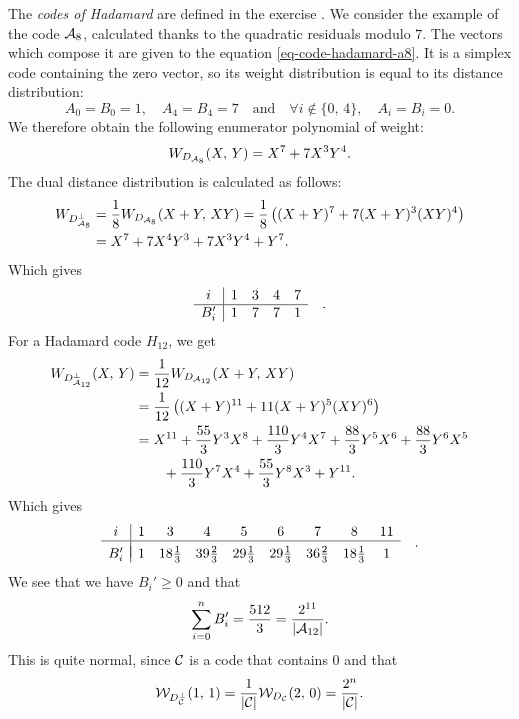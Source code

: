 \begin{exmp}
  The \textit{codes of Hadamard} are defined in the exercise . We consider the example of the code $ \mathcal{A}_8 $, calculated thanks to the quadratic residuals modulo $ 7 $. The vectors which compose it are given to the equation \eqref{eq-code-hadamard-a8}. It is a simplex code containing the zero vector, so its weight distribution is equal to its distance distribution:
\begin{equation*}
A_0 = B_0 = 1, \quad A_4 = B_4 = 7 \quad \text{and} \quad \forall i \notin \{0, \, 4\}, \quad A_i = B_i = 0.
\end{equation*}
We therefore obtain the following enumerator polynomial of weight:
\begin{equation*}
W_{D_{\mathcal{A}_8}} (X, \, Y) = X^{7} + 7 X^{3} Y^{4}.
\end{equation*}
The dual distance distribution is calculated as follows:
\begin{align*}
W_{D_{\mathcal{A}_8}^\bot} & = \frac{1}{8} W_{D_{\mathcal{A}_8}} (X + Y, \, XY) = \frac{1}{8} \left( (X + Y)^7 + 7 (X + Y)^3 (XY)^4 \right) \\
& = X^7 + 7 X^4 Y^3 + 7 X^3 Y^4 + Y^7.
\end{align*}
Which gives
\begin{equation*}
\begin{array}{c | cccc} i & 1 & 3 & 4 & 7 \\\hline B_i'& 1 & 7 & 7 & 1 \end{array} \quad.
\end{equation*}
For a Hadamard code $ H_{12} $, we get
\begin{align*}
W_{D_{\mathcal{A}_{12}}^\bot} (X, \, Y) & = \frac{1}{12} W_{D_{\mathcal{A}_{12}}} (X + Y, \, XY ) \\
& = \frac{1}{12} \left((X + Y)^{11} + 11 (X + Y)^5 (XY)^6 \right) \\
& = X^{11} + \frac{55}{3} Y^3 X^8 + \frac{110}{3} Y^4 X^7 + \frac{88}{3} Y^5 X^6 + \frac{88}{3} Y^6 X^5 \\
& \quad \quad + \frac{110}{3} Y^7 X^4 + \frac{55}{3} Y^8 X^3 + Y^{11}.
\end{align*}
Which gives
\begin{equation*}
\begin{array}{c | cccccccc} i & 1 & 3 & 4 & 5 & 6 & 7 & 8 & 11 \\\hline \\[- 3mm] B_i'& 1 & 18 \frac{1}{3 } & 39 \frac{2}{3} & 29 \frac{1}{3} & 29 \frac{1}{3} & 36 \frac{2}{3} & 18 \frac{1}{3 } & 1 \end{array} \quad.
\end{equation*}
We see that we have $ B_i'\geq 0 $ and that
\begin{equation*}
\sum_{i = 0}^n{B_i'} = \frac{512}{3} = \frac{2^{11}}{| \mathcal{A}_{12} |}.
\end{equation*}
This is quite normal, since $ \mathcal{C} $ is a code that contains $ 0 $ and that
\begin{equation*}
\mathcal{W}_{D_{\mathcal{C}}^\bot} (1, \, 1) = \frac{1}{| \mathcal{C} |} \mathcal{W}_{D_{\mathcal{C}}} (2, \, 0) = \frac{2^n }{| \mathcal{C} |}.
\end{equation*}
\end{exmp}
 
